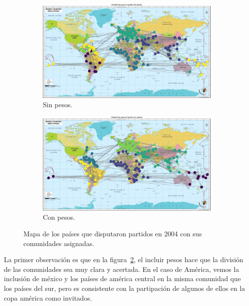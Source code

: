 \documentclass{article}
\begin{document}
\begin{figure}[htb]
    \centering
    \begin{subfigure}{0.49\textwidth}
        \centering
        \includegraphics[width=\linewidth]{images/mapas/mapa_sin_pesos_2004.pdf}
        \caption{Sin pesos.}
        \label{fig:2004_sin_pesos}
    \end{subfigure}
    \begin{subfigure}{0.49\textwidth}
        \centering
        \includegraphics[width=\linewidth]{images/mapas/mapa_con_pesos_2004.pdf}
        \caption{Con pesos.}
        \label{fig:2004_con_pesos}
    \end{subfigure}
    \caption{Mapa de los países que disputaron partidos en 2004 con sus comunidades asignadas.}
    \label{fig:mapa_2004}
\end{figure}

La primer observación es que en la figura~\ref{fig:2004_con_pesos}, el incluir pesos hace que la 
división de las comunidades sea muy clara y acertada. En el caso de América, vemos la inclusión de
méxico y los países de américa central en la misma comunidad que los países del sur, pero es consistente
con la partipación de algunos de ellos en la copa américa como invitados.
\end{document}
